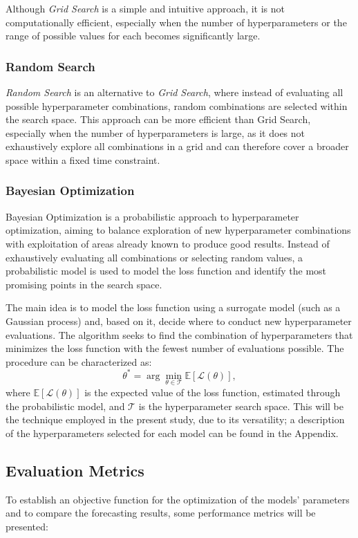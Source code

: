 Although \textit{Grid Search} is a simple and intuitive approach, it is not computationally efficient, especially when the number of hyperparameters or the range of possible values for each becomes significantly large.

\subsubsection{Random Search}
\textit{Random Search} is an alternative to \textit{Grid Search}, where instead of evaluating all possible hyperparameter combinations, random combinations are selected within the search space. 
This approach can be more efficient than Grid Search, especially when the number of hyperparameters is large, as it does not exhaustively explore all combinations in a grid and can therefore cover a broader space within a fixed time constraint.

\subsubsection{Bayesian Optimization}
Bayesian Optimization \citep{snoek2012practical} is a probabilistic approach to hyperparameter optimization, aiming to balance exploration of new hyperparameter combinations with exploitation of areas already known to produce good results. Instead of exhaustively evaluating all combinations or selecting random values, a probabilistic model is used to model the loss function and identify the most promising points in the search space.

The main idea is to model the loss function using a surrogate model (such as a Gaussian process) and, based on it, decide where to conduct new hyperparameter evaluations. The algorithm seeks to find the combination of hyperparameters that minimizes the loss function with the fewest number of evaluations possible. The procedure can be characterized as:
\begin{equation}
    \theta^* = \arg\min_{\theta \in \mathcal{T}} \mathbb{E}[\mathcal{L}(\theta)],
\end{equation}
where $\mathbb{E}[\mathcal{L}(\theta)]$ is the expected value of the loss function, estimated through the probabilistic model, and $\mathcal{T}$ is the hyperparameter search space. This will be the technique employed in the present study, due to its versatility; a description of the hyperparameters selected for each model can be found in the Appendix.

\subsection{Evaluation Metrics}
To establish an objective function for the optimization of the models' parameters and to compare the forecasting results, some performance metrics will be presented:


